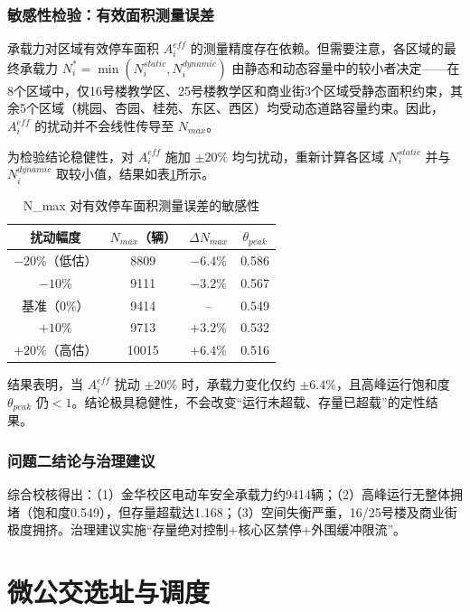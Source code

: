 \documentclass[UTF8,zihao=-4,a4paper]{ctexart}
\numberwithin{table}{section}
\numberwithin{figure}{section}
\numberwithin{equation}{section}
\begin{document}
\subsubsection{敏感性检验：有效面积测量误差}

承载力对区域有效停车面积 $A_i^{eff}$ 的测量精度存在依赖。但需要注意，各区域的最终承载力 $N_i^*=\min(N_i^{static},N_i^{dynamic})$ 由静态和动态容量中的较小者决定——在8个区域中，仅16号楼教学区、25号楼教学区和商业街3个区域受静态面积约束，其余5个区域（桃园、杏园、桂苑、东区、西区）均受动态道路容量约束。因此，$A_i^{eff}$ 的扰动并不会线性传导至 $N_{max}$。

为检验结论稳健性，对 $A_i^{eff}$ 施加 $\pm20\%$ 均匀扰动，重新计算各区域 $N_i^{static}$ 并与 $N_i^{dynamic}$ 取较小值，结果如表\ref{tab:sensitivity_area}所示。

\begin{table}[H]
\footnotesize
\centering
\caption{N\_max 对有效停车面积测量误差的敏感性}
\label{tab:sensitivity_area}
\begin{tabular}{cccc}
\toprule
\textbf{扰动幅度} & \textbf{$N_{max}$（辆）} & \textbf{$\Delta N_{max}$} & \textbf{$\theta_{peak}$} \\
\midrule
$-20\%$（低估） & 8809 & $-6.4\%$ & 0.586 \\
$-10\%$ & 9111 & $-3.2\%$ & 0.567 \\
基准（0\%） & 9414 & -- & 0.549 \\
$+10\%$ & 9713 & $+3.2\%$ & 0.532 \\
$+20\%$（高估） & 10015 & $+6.4\%$ & 0.516 \\
\bottomrule
\end{tabular}
\end{table}

结果表明，当 $A_i^{eff}$ 扰动 $\pm20\%$ 时，承载力变化仅约 $\pm6.4\%$，且高峰运行饱和度 $\theta_{peak}$ 仍$<1$。结论极具稳健性，不会改变“运行未超载、存量已超载”的定性结果。

\subsubsection{问题二结论与治理建议}

综合校核得出：（1）金华校区电动车安全承载力约9414辆；（2）高峰运行无整体拥堵（饱和度0.549），但存量超载达1.168；（3）空间失衡严重，16/25号楼及商业街极度拥挤。治理建议实施“存量绝对控制+核心区禁停+外围缓冲限流”。

\newpage

\section{微公交选址与调度}
\end{document}

